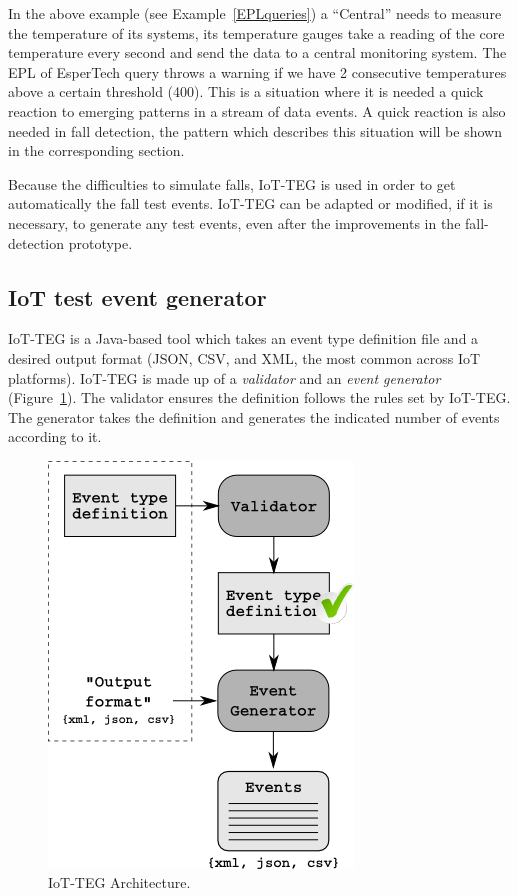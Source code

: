 \documentclass[conference]{IEEEtran}
\theoremstyle{definition}
\begin{document}
In the above example (see Example~\ref{EPLqueries}) a ``Central'' needs to measure the temperature of its systems, its temperature gauges take a 
reading of the core temperature every second and send the data to a central monitoring system. The EPL of EsperTech query throws a warning if we have 
2 consecutive temperatures above a certain threshold (400). This is a situation where it is needed a quick reaction to emerging patterns in a 
stream of data events. A quick reaction is also needed in fall detection, the pattern which describes this situation will be shown in the 
corresponding section.
 
Because the difficulties to simulate falls, IoT-TEG is used in order to get automatically the fall test events. IoT-TEG can be adapted or
modified, if it is necessary, to generate any test events, even after the improvements in the fall-detection prototype.

\subsection{IoT test event generator}
\label{iotteg}

IoT-TEG is a Java-based tool which takes an event type definition file and a desired output
format (JSON, CSV, and XML, the most common across IoT platforms). IoT-TEG is made up of a
\emph{validator} and an \emph{event generator} (Figure~\ref{fig:IoT-EGArquitecture}). The
validator ensures the definition follows the rules set by IoT-TEG. The generator takes the
definition and generates the indicated number of events according to it.

\begin{figure}[!h]
  \centering
  \includegraphics[scale=0.65]{./img/IoT-EGArquitecture}
  \caption[IoT-TEG Architecture]{IoT-TEG Architecture.}
  \label{fig:IoT-EGArquitecture}
\end{figure}
\end{document}
